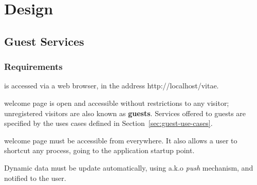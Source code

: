 \chapter{Design}
\label{sec:design}

\section{Guest Services}
\label{sec:guest-services}

\subsection{Requirements}
\label{sec:registation-requirements}

\begin{req}
  \label{req:lifetime-location}
  \lifetime is accessed via a web browser, in the address
  http://localhost/vitae.
\end{req}
%
\begin{req}
  \lifetime welcome page is open and accessible without restrictions
  to any visitor; unregistered visitors are also known as
  \textbf{guests}. Services offered to guests are specified by the
  uses cases defined in Section~\ref{sec:guest-use-cases}.
\end{req}
%
\begin{req}
  \lifetime welcome page must be accessible from everywhere. It also
  allows a user to shortcut any process, going to the application
  startup point.
\end{req}
%
\begin{req}
  Dynamic data must be update automatically, using a.k.o \emph{push}
  mechanism, and notified to the user.
\end{req}
%


%
